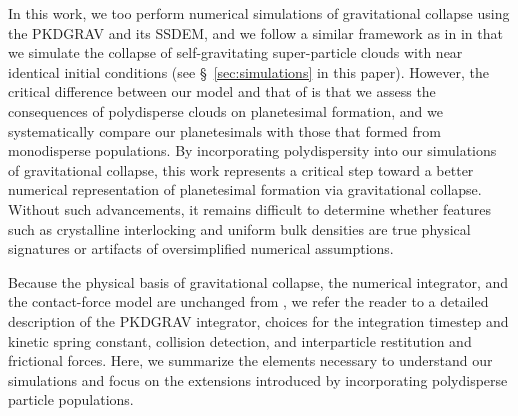 \documentclass[fleqn,usenatbib]{mnras}
\begin{document}
In this work, we too perform numerical simulations of gravitational collapse using the PKDGRAV and its SSDEM, and we follow a similar framework as in \citet{Barnes2025} in that we simulate the collapse of self-gravitating super-particle clouds with near identical initial conditions (see \S~\ref{sec:simulations} in this paper).
However, the critical difference between our model and that of \citet{Barnes2025} is that we assess the consequences of polydisperse clouds on planetesimal formation, and we systematically compare our planetesimals with those that formed from monodisperse populations.
By incorporating polydispersity into our simulations of gravitational collapse, this work represents a critical step toward a better numerical representation of planetesimal formation via gravitational collapse. 
Without such advancements, it remains difficult to determine whether features such as crystalline interlocking and uniform bulk densities are true physical signatures or artifacts of oversimplified numerical assumptions. 



Because the physical basis of gravitational collapse, the numerical integrator, and the contact-force model are unchanged from \citet{Barnes2025}, we refer the reader to a detailed description of the PKDGRAV integrator, choices for the integration timestep and kinetic spring constant, collision detection, and interparticle restitution and frictional forces. 
Here, we summarize the elements necessary to understand our simulations and focus on the extensions introduced by incorporating polydisperse particle populations.
\end{document}
